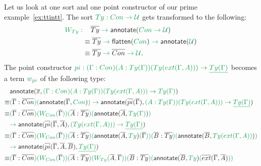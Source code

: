 \documentclass[12pt,headings=optiontohead,openany,oneside,a4paper]{book}
\theoremstyle{definition}
\newcommand{\UU}{\mathcal{U}}
\newcommand{\gr}[1]{{\color{ForestGreen}#1}}
\newcommand{\grm}[1]{\ensuremath{\gr{#1}}}
\newcommand{\blm}[1]{\ensuremath{{\color{Black}#1}}}
\newcommand{\flatten}[1]{\blm{\mathsf{flatten}(\grm{#1})}}
\newcommand{\annotate}[1]{\blm{\mathsf{annotate}(\grm{#1})}}
\newcommand{\anntwo}[2]{\blm{\mathsf{annotate}(#1, \grm{#2})}}
\begin{document}
\begin{example}
Let us look at one sort and one point constructor of our prime example~\ref{ex:ttintt}.
The sort \grm{\mathop{Ty} : \mathop{Con} \to \UU} gets transformed to the following:
\begin{align*}
\grm{W_{\mathop{Ty}} :} 
&\phantom{\equiv~} \grm{\blm{\overline{Ty}} \to \annotate{\mathop{Con} \to \UU} } \\
&\equiv \grm{\blm{\overline{Ty}} \to \flatten{\mathop{Con}} \to \annotate{\UU}} \\
&\equiv \grm{\blm{\overline{Ty}} \to \blm{\overline{Con}} \to \UU} \text{.}
\end{align*}
The point constructor
\grm{\mathop{pi} : (\Gamma : \mathop{Con})(A : \mathop{Ty}(\Gamma))(\mathop{Ty}(\mathop{ext}(\Gamma, A))) \to \underline{\mathop{Ty}(\Gamma)}}
becomes a term \grm{w_{\mathop{pi}}} of the following type:
\begin{align*}
& \grm{\anntwo{\overline{x}}{(\Gamma : \mathop{Con})(A : \mathop{Ty}(\Gamma))(\mathop{Ty}(\mathop{ext}(\Gamma, A)))
	\to \mathop{Ty}(\Gamma)}} \\
\equiv & \grm{(\blm{\overline{\Gamma} : \overline{Con}})(\anntwo{\overline{\Gamma}}{\mathop{Con}})
	\to \anntwo{\overline{pi}(\overline{\Gamma})}{(A : \mathop{Ty}(\Gamma))(\mathop{Ty}(\mathop{ext}(\Gamma, A))) \to \underline{\mathop{Ty}(\Gamma)}}} \\
\equiv & \grm{
	(\blm{\overline{\Gamma} : \overline{Con}})(W_{\mathop{Con}}(\blm{\overline{\Gamma}}))
	(\blm{\overline{A} : \overline{Ty}})(\anntwo{\overline{A}}{\mathop{Ty}(\Gamma)}) } \\
& \grm{
	\to \anntwo{\overline{pi}(\overline{\Gamma}, \overline{A})}{(\mathop{Ty}(\mathop{ext}(\Gamma, A))) \to \underline{\mathop{Ty}(\Gamma)}}
} \\
\equiv & \grm{
	(\blm{\overline{\Gamma} : \overline{Con}})(W_{\mathop{Con}}(\blm{\overline{\Gamma}}))
	(\blm{\overline{A} : \overline{Ty}})(\anntwo{\overline{A}}{\mathop{Ty}}(\blm{\overline{\Gamma}}))
	(\blm{\overline{B} : \overline{Ty}})(\anntwo{\overline{B}}{\mathop{Ty}(\mathop{ext}(\Gamma, A))}) } \\
& \grm{
	\to \anntwo{\overline{pi}(\overline{\Gamma}, \overline{A}, \overline{B})}{\underline{Ty(\Gamma)}}
} \\
\equiv & \grm{
	(\blm{\overline{\Gamma} : \overline{Con}})(W_{\mathop{Con}}(\blm{\overline{\Gamma}}))
	(\blm{\overline{A} : \overline{Ty}})(W_{\mathop{Ty}}(\blm{\overline{A}}, \blm{\overline{\Gamma}}))
	(\blm{\overline{B} : \overline{Ty}})(\anntwo{\overline{B}}{\mathop{Ty}}(\blm{\overline{ext}(\overline{\Gamma}, \overline{A})}))
}
\end{align*}
\end{example}
\end{document}
